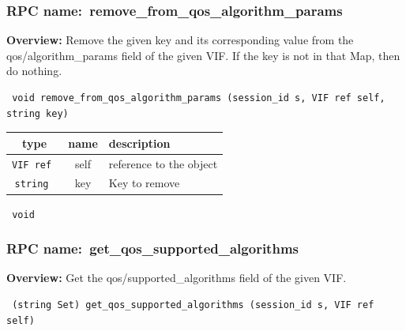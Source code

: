 \vspace{0.3cm}
\vspace{0.3cm}
\vspace{0.3cm}
\subsubsection{RPC name:~remove\_from\_qos\_algorithm\_params}

{\bf Overview:} 
Remove the given key and its corresponding value from the
qos/algorithm\_params field of the given VIF.  If the key is not in that
Map, then do nothing.

\begin{verbatim} void remove_from_qos_algorithm_params (session_id s, VIF ref self, string key)\end{verbatim}



 
\vspace{0.3cm}
\begin{tabular}{|c|c|p{7cm}|}
 \hline
{\bf type} & {\bf name} & {\bf description} \\ \hline
{\tt VIF ref } & self & reference to the object \\ \hline 

{\tt string } & key & Key to remove \\ \hline 

\end{tabular}

\vspace{0.3cm}

{\tt 
void
}



\vspace{0.3cm}
\vspace{0.3cm}
\vspace{0.3cm}
\subsubsection{RPC name:~get\_qos\_supported\_algorithms}

{\bf Overview:} 
Get the qos/supported\_algorithms field of the given VIF.

\begin{verbatim} (string Set) get_qos_supported_algorithms (session_id s, VIF ref self)\end{verbatim}



